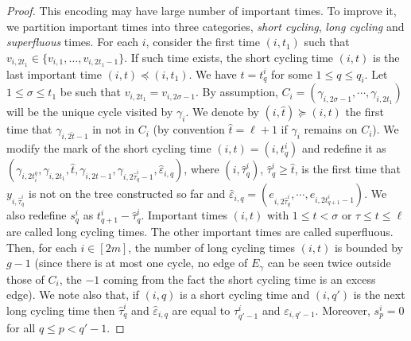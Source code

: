 \documentclass[11pt]{article}
\newcommand{\cE}{E}
\newcommand{\1}{1\!\!{\sf I}}\newcommand{\IND}{\1}
\newcommand{\veps}{\varepsilon}
\begin{document}
\begin{proof}
This encoding may have large number of important times. To improve it, we partition important times into three categories, {\em short cycling}, {\em long cycling} and {\em superfluous} times. For each $i$, consider the first time $(i,t_1)$ such that $v_{i,2t_1} \in \{ v_{i,1}, \ldots, v_{i,2t_1-1} \}$. If such time exists, the short cycling time $(i,t)$ is the last important time $(i,t) \preceq (i,t_1)$. We have $t = t^i_q$ for some $1 \leq q \leq q_i$.  Let $1 \leq \sigma \leq t_1$ be such that $v_{i,2t_1} = v_{i,2\sigma -1}$. By assumption, $C_i = (\gamma_{i,2\sigma-1},\cdots, \gamma_{i,2t_1})$ will be the unique cycle visited by $\gamma_i$. We denote by $(i,\hat t) \succeq (i,t)$ the first time that $\gamma_{i,2\hat t-1}$ in not in $C_i$ (by convention $\hat t = \ell+1$ if $\gamma_i$ remains on $C_i$). We modify the mark of the short cycling time $(i,t) = (i,t^i_q)$ and redefine it as $(\gamma_{i,2t^q_i}, \gamma_{i,2t_1}, \hat  t, \gamma_{i,2\hat t  -1},\gamma_{i,2\hat \tau^i_q  -1} ,\hat \veps_{i,q})$, where $(i,\hat \tau^i_q)$, $\hat \tau^i_q \geq \hat t$, is the first time that $y_{i,\hat \tau^i_q}$ is not on the tree constructed so far and  $\hat \veps_{i,q} = (e_{i,2\hat\tau^i_q},  \cdots, e_{i,2 t^i_{q+1} -1})$. We also redefine $s^i_q $ as $t^i_{q+1} - \hat \tau^i_q$. Important times $(i,t)$ with $1 \leq t < \sigma$ or $\tau \leq t \leq \ell$ are called long cycling times. The other important times are called superfluous. Then, for each $i \in [2 m]$, the number of long cycling times $(i,t)$ is bounded by  $g-1$ (since there is at most one cycle, no edge of $\cE_\gamma$ can be seen twice outside those of $C_i$, the $-1$ coming from the fact the short cycling time is an excess edge).  We note also that, if $(i,q)$ is a short cycling time and $(i,q')$ is the next long cycling time then $\hat \tau^i_q$ and $\hat \veps_{i,q}$ are equal to $\tau^i_{q'-1}$ and $\veps_{i,q'-1}$. Moreover, $s^i_p = 0$ for all $q \leq p < q' -1$.



\end{proof}
\end{document}
